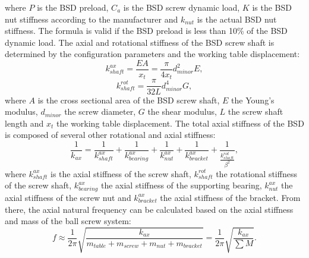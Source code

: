 where $P$ is the BSD preload, $C_{a}$ is the BSD screw dynamic load, $K$ is the BSD nut stiffness according to the manufacturer and $k_{nut}$ is the actual BSD nut stiffness. The formula is valid if the BSD preload is less than 10\% of the BSD dynamic load. The axial and rotational stiffness of the BSD screw shaft is determined by the configuration parameters and the working table displacement:
\begin{equation}
    k_{shaft}^{ax}=\frac{EA}{x_{t}}=\frac{\pi}{4x_{t}}d_{minor}^{2}E,
\end{equation}
\begin{equation}
    k_{shaft}^{rot}=\frac{\pi}{32L}d_{minor}^{4}G,
\end{equation}
 where $A$ is the cross sectional area of the BSD screw shaft, $E$ the Young’s modulus, $d_{minor}$ the screw diameter, $G$ the shear modulus, $L$ the screw shaft length and $x_{t}$ the working table displacement. The total axial stiffness of the BSD is composed of several other rotational and axial stiffness:
 \begin{equation}
    \frac{1}{k_{ax}}=\frac{1}{k_{shaft}^{ax}}+\frac{1}{k_{bearing}^{ax}}+\frac{1}{k_{nut}^{ax}}+\frac{1}{k_{bracket}^{ax}}+\frac{1}{\frac{k_{shaft}^{rot}}{\beta^{2}}},
\end{equation}
where $k_{shaft}^{ax}$ is the axial stiffness of the screw shaft,  $k_{shaft}^{rot}$ the rotational stiffness of the screw shaft, $k_{bearing}^{ax}$ the axial stiffness of the supporting bearing, $k_{nut}^{ax}$ the axial stiffness of the screw nut and $k_{bracket}^{ax}$ the axial stiffness of the bracket. From there, the axial natural frequency can be calculated based on the axial stiffness and mass of the ball screw system:
\begin{equation}
    f\approx\frac{1}{2\pi}\sqrt{\frac{k_{ax}}{m_{table}+m_{screw}+m_{nut}+m_{bracket}}}=\frac{1}{2\pi}\sqrt{\frac{k_{ax}}{\sum M}}.
\end{equation}

